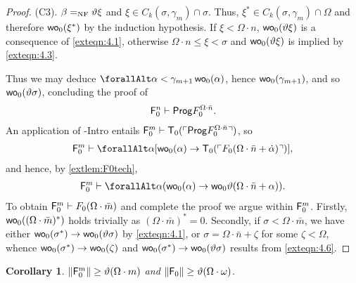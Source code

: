 \documentclass[UKenglish,cleveref,DIV=12]{scrartcl}
\let\forall\forallAlt
\newtheorem{corollary}[lemma]{Corollary}
\theoremstyle{definition}
\theoremstyle{definition}
\begin{document}
\begin{proof}
(C3). $\beta=_{\mathrm{NF}}\vartheta\xi$ and $\xi\in C_k(\sigma,\gamma_m)\cap\sigma$. Thus,
$\xi^*\in C_k(\sigma,\gamma_m)\cap\Omega$ and therefore $\mathsf{wo}_0(\xi^*)$ by the
induction hypothesis. If $\xi<\Omega\cdot n$, $\mathsf{wo}_0(\vartheta\xi)$ is a
consequence of \cref{exteqn:4.1}, otherwise $\Omega\cdot n\le\xi<\sigma$ and
$\mathsf{wo}_0(\vartheta\xi)$ is implied by \cref{exteqn:4.3}.

Thus we may deduce $\forall\alpha<\gamma_{m+1}\,\wo_0(\alpha)$, hence
$\mathsf{wo}_0(\gamma_{m+1})$, and so $\mathsf{wo}_0(\vartheta\sigma)$, concluding the proof of
\begin{align}\label{exteqn:4.2}
  \mathsf{F}_0^n\vdash\mathsf{Prog} F^{\Omega\cdot\bar n}_0.
\end{align}
An application of -Intro entails $\mathsf{F}_0^m\vdash \mathsf{T}_0(\ulcorner{\mathsf{Prog}F^{\Omega\cdot\bar n}_0}\urcorner)$, so
\begin{align*}
  \F_0^m\proves\forall\alpha[\wo_0(\alpha)\rightarrow
   \T_0(\gn{F_0(\Omega\cdot\bar n+\dot\alpha)})],
\end{align*}
and hence, by \cref{extlem:F0tech},
\begin{align}\label{exteqn:4.6}
  \F_0^m\proves\forall\alpha(\wo_0(\alpha)\rightarrow\wo_0\vartheta(\Omega\cdot\bar
  n+\alpha)).
\end{align}
To obtain $\mathsf{F}_0^m\vdash F_0(\Omega\cdot\bar m)$ and complete the proof we
argue within $\mathsf{F}_0^m$. Firstly, $\mathsf{wo}_0((\Omega\cdot\bar m)^*)$ holds trivially as $(\Omega\cdot\bar m)^*=0$. Secondly, if
$\sigma<\Omega\cdot\bar m$, we have either $\mathsf{wo}_0(\sigma^*)\rightarrow
\mathsf{wo}_0(\vartheta\sigma)$ by \cref{exteqn:4.1}, or $\sigma=\Omega\cdot\bar
n+\zeta$ for some $\zeta<\Omega$, whence $\mathsf{wo}_0(\sigma^*)\rightarrow \mathsf{wo}_0(\zeta)$
and $\mathsf{wo}_0(\sigma^*)\rightarrow \mathsf{wo}_0(\vartheta\sigma)$ results from
\cref{exteqn:4.6}.
\end{proof}
\begin{corollary}\label{extcor:F0lowerbound}
 $\lVert{\mathsf{F}_0^m}\rVert\ge\vartheta(\Omega\cdot m)$ and $\lVert{\mathsf{F}_0}\rVert\ge\vartheta(\Omega\cdot\omega)$.
\end{corollary}
\end{document}
